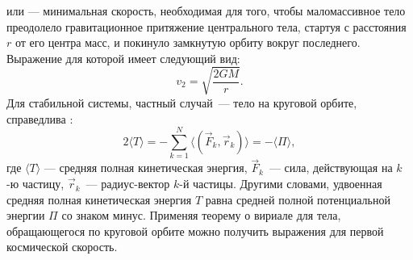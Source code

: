  или  --- 
минимальная скорость, необходимая для того, чтобы маломассивное тело преодолело гравитационное притяжение центрального тела, стартуя с расстояния $r$ от его центра масс, и покинуло замкнутую орбиту вокруг 
последнего. Выражение для которой имеет следующий вид:\begin{equation}
v_{2}=\sqrt{\frac{2GM}{r}}.
\end{equation}
Для стабильной системы, частный случай~--- тело на круговой орбите, справедлива 
:
\begin{equation}
2 \langle T\rangle 
= -\sum _{{k=1}}^{N}\langle (\vec{F}_{k}, \vec{r}_{k})\rangle 
= -\langle \Pi \rangle,
\end{equation}
где $\langle T\rangle$ --- средняя полная кинетическая энергия, $\vec{F}_k$~--- сила, 
действующая на $k$-ю частицу, $\vec{r}_k$~--- радиус-вектор $k$-й частицы. Другими словами, удвоенная средняя полная 
кинетическая энергия $T$ равна средней полной потенциальной энергии $\Pi$ со знаком минус. Применяя теорему о вириале для тела, обращающегося по круговой орбите можно 
получить выражения для первой космической скорость.